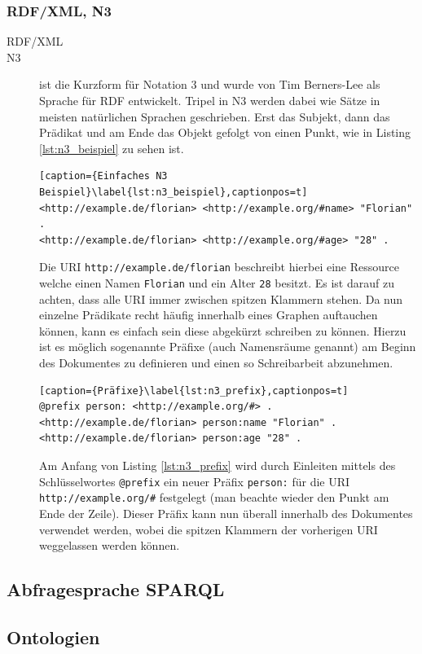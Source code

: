 \subsubsection{RDF/XML, N3} %
\label{ssub:rdf_xml_n3}

\begin{description}
    \item[RDF/XML] 
    \item[N3] ist die Kurzform für Notation 3 und wurde von Tim Berners-Lee als Sprache für RDF entwickelt. Tripel in N3 werden dabei wie Sätze in meisten natürlichen Sprachen geschrieben. Erst das Subjekt, dann das Prädikat und am Ende das Objekt gefolgt von einen Punkt, wie in  Listing \ref{lst:n3_beispiel} zu sehen ist.
    \begin{lstlisting}[caption={Einfaches N3 Beispiel}\label{lst:n3_beispiel},captionpos=t]
<http://example.de/florian> <http://example.org/#name> "Florian" .
<http://example.de/florian> <http://example.org/#age> "28" .    \end{lstlisting} 
    Die URI \texttt{http://example.de/florian} beschreibt hierbei eine Ressource welche einen Namen \texttt{Florian} und ein Alter \texttt{28} besitzt. Es ist darauf zu achten, dass alle URI immer zwischen spitzen Klammern stehen. Da nun einzelne Prädikate recht häufig innerhalb eines Graphen auftauchen können, kann es einfach sein diese abgekürzt schreiben zu können. Hierzu ist es möglich sogenannte Präfixe (auch Namensräume genannt) am Beginn des Dokumentes zu definieren und einen so Schreibarbeit abzunehmen.

    \begin{lstlisting}[caption={Präfixe}\label{lst:n3_prefix},captionpos=t]
@prefix person: <http://example.org/#> .
<http://example.de/florian> person:name "Florian" .
<http://example.de/florian> person:age "28" .    \end{lstlisting}

    Am Anfang von Listing \ref{lst:n3_prefix} wird durch Einleiten mittels des Schlüsselwortes \texttt{@prefix} ein neuer Präfix \texttt{person:} für die URI \texttt{http://example.org/\#} festgelegt (man beachte wieder den Punkt am Ende der Zeile). Dieser Präfix kann nun überall innerhalb des Dokumentes verwendet werden, wobei die spitzen Klammern der vorherigen URI weggelassen werden können.


\end{description}


\subsection{Abfragesprache SPARQL} %
\label{ssub:abfragesprache_sparql}


\subsection{Ontologien} %
\label{sub:ontologien}


